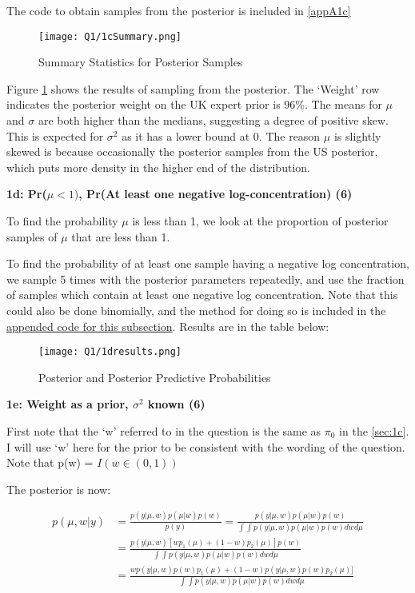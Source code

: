 \documentclass{article}
\begin{document}
The code to obtain samples from the posterior is included in \ref{appA1c}

\begin{figure}[h]
\centering
\texttt{[image: Q1/1cSummary.png]}
\caption{Summary Statistics for Posterior Samples} \label{Fig1c}
\end{figure}

Figure \ref{Fig1c} shows the results of sampling from the posterior. The `Weight' row indicates the posterior weight on the UK expert prior is 96\%. The means for $\mu$ and $\sigma$ are both higher than the medians, suggesting a degree of positive skew. This is expected for $\sigma^2$ as it has a lower bound at 0. The reason $\mu$ is slightly skewed is because occasionally the posterior samples from the US posterior, which puts more density in the higher end of the distribution. 

\textbf{1d: Pr($\mu < 1)$, Pr(At least one negative log-concentration) (6)} \label{sec:1d}

To find the probability $\mu$ is less than 1, we look at the proportion of posterior samples of $\mu$ that are less than 1. 

To find the probability of at least one sample having a negative log concentration, we sample 5 times with the posterior parameters repeatedly, and use the fraction of samples which contain at least one negative log concentration. Note that this could also be done binomially, and the method for doing so is included in the \hyperref[appA1d]{appended code for this subsection}. Results are in the table below:

\vspace*{-2.5mm}

\begin{figure}[h]
\centering
\texttt{[image: Q1/1dresults.png]}
\caption{Posterior and Posterior Predictive Probabilities} \label{Fig1d}
\end{figure}

\textbf{1e: Weight as a prior, $\sigma^2$ known (6)} \label{sec:1e}

First note that the `w' referred to in the question is the same as $\pi_0$ in the \ref{sec:1c}. I will use `w' here for the prior to be consistent with the wording of the question. Note that p(w) = $I(w \in (0,1))$

The posterior is now:

\begin{align}
p(\mu, w | y) &= \frac{p(y|\mu, w)p(\mu|w)p(w)}{p(y)} = \frac{p(y|\mu, w)p(\mu|w)p(w)}{\int \int p(y|\mu, w)p(\mu|w)p(w) dw d\mu}\\
&= \frac{p(y|\mu, w)[wp_1(\mu) + (1-w)p_2(\mu)]p(w)}{\int \int p(y|\mu, w)p(\mu|w)p(w) dw d\mu} \\
&= \frac{wp(y|\mu, w)p(w)p_1(\mu) + (1-w)p(y|\mu, w)p(w)p_2(\mu)]}{\int \int p(y|\mu, w)p(\mu|w)p(w) dw d\mu}
\end{align}
\end{document}
